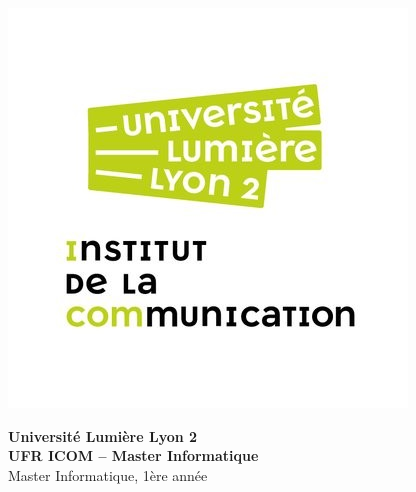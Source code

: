 \documentclass{article}
\begin{document}
\vspace*{-1.5cm}
\begin{tcolorbox}[colframe=myblue, colback=white, boxrule=1pt, arc=4pt, width=\textwidth, left=0pt, right=0pt, top=2pt, bottom=2pt]
    \begin{minipage}{0.20\textwidth}
        \includegraphics[width=\textwidth]{image/icom.jpg}
    \end{minipage}
    \hfill
    \begin{minipage}{0.6\textwidth}
        \centering
        {\large\bfseries Université Lumière Lyon 2}\\[0.3em]
        {\normalsize\bfseries UFR ICOM – Master Informatique}\\[0.3em]
        {\small Master Informatique, 1ère année}
    \end{minipage}
    \hfill
    \begin{minipage}{0.18\textwidth}

\end{minipage}
\end{tcolorbox}
\end{document}
